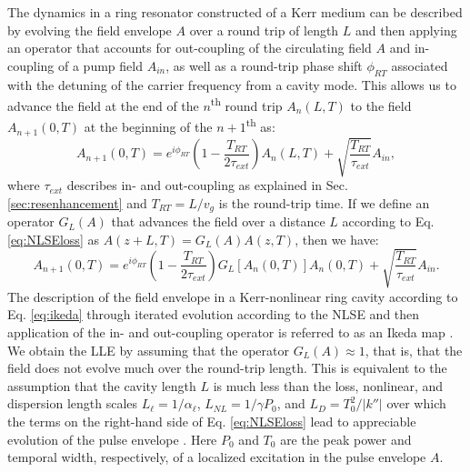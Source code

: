 The dynamics in a ring resonator constructed of a Kerr medium can be described by evolving the field envelope $A$ over a round trip of length $L$ and then applying an operator that accounts for out-coupling of the circulating field $A$ and in-coupling of a pump field $A_{in}$, as well as a round-trip phase shift $\phi_{RT}$ associated with the detuning of the carrier frequency from a cavity mode. This allows us to advance the field at the end of the $n$\textsuperscript{th} round trip $A_n(L,T)$ to the field $A_{n+1}(0,T)$ at the beginning of the $n+1$\textsuperscript{th} as:
\begin{equation}
A_{n+1}(0,T)=e^{i\phi_{RT}}\left(1-\frac{T_{RT}}{2\tau_{ext}}\right)A_n(L,T)+\sqrt{\frac{T_{RT}}{\tau_{ext}}}A_{in},
\end{equation}
where $\tau_{ext}$ describes in- and out-coupling as explained in Sec. \ref{sec:resenhancement} and $T_{RT}=L/v_g$ is the round-trip time. If we define an operator $G_L(A)$ that advances the field over a distance $L$ according to Eq. \ref{eq:NLSEloss} as $A(z+L,T)=G_L(A)A(z,T)$, then we have:
\begin{equation}
A_{n+1}(0,T)=e^{i\phi_{RT}}\left(1-\frac{T_{RT}}{2\tau_{ext}}\right)G_L\left[A_n(0,T)\right]A_n(0,T)+\sqrt{\frac{T_{RT}}{\tau_{ext}}}A_{in}. \label{eq:ikeda}
\end{equation}
The description of the field envelope in a Kerr-nonlinear ring cavity according to Eq. \ref{eq:ikeda} through iterated evolution according to the NLSE and then application of the in- and out-coupling operator is referred to as an Ikeda map \cite{Ikeda1979}. We obtain the LLE by assuming that the operator $G_L(A)\approx1$, that is, that the field does not evolve much over the round-trip length. This is equivalent to the assumption that the cavity length $L$ is much less than the loss, nonlinear, and dispersion length scales $L_\ell=1/\alpha_\ell$, $L_{NL}=1/\gamma P_0$, and $L_D=T_0^2/|k''|$ over which the terms on the right-hand side of Eq. \ref{eq:NLSEloss} lead to appreciable evolution of the pulse envelope \cite{Agrawal2007}. Here $P_0$ and $T_0$ are the peak power and temporal width, respectively, of a localized excitation in the pulse envelope $A$.

